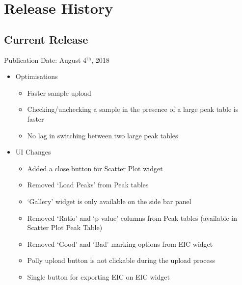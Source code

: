 \documentclass[letterpaper,10pt,english,openany,oneside]{sphinxmanual}
\begin{document}
\section{Release History}
\label{\detokenize{ReleaseHistory:release-history}}\label{\detokenize{ReleaseHistory::doc}}

\subsection{Current Release}
\label{\detokenize{ReleaseHistory:current-release}}

Publication Date: August 4$^{\text{th}}$, 2018
\begin{itemize}
\item {} 
Optimisations
\begin{itemize}
\item {} 
Faster sample upload

\item {} 
Checking/unchecking a sample in the presence of a large peak table is faster 

\item {} 
No lag in switching between two large peak tables

\end{itemize}

\item {} 
UI Changes
\begin{itemize}
\item {} 
Added a close button for Scatter Plot widget

\item {} 
Removed ‘Load Peaks’ from Peak tables

\item {} 
‘Gallery’ widget is only available on the side bar panel

\item {} 
Removed ‘Ratio’ and ‘p-value’ columns from Peak tables (available in Scatter Plot Peak Table)

\item {} 
Removed ‘Good’ and ‘Bad’ marking options from EIC widget

\item {} 
Polly upload button is not clickable during the upload process 

\item {} 
Single button for exporting EIC on EIC widget


\end{itemize}
\end{itemize}
\end{document}
